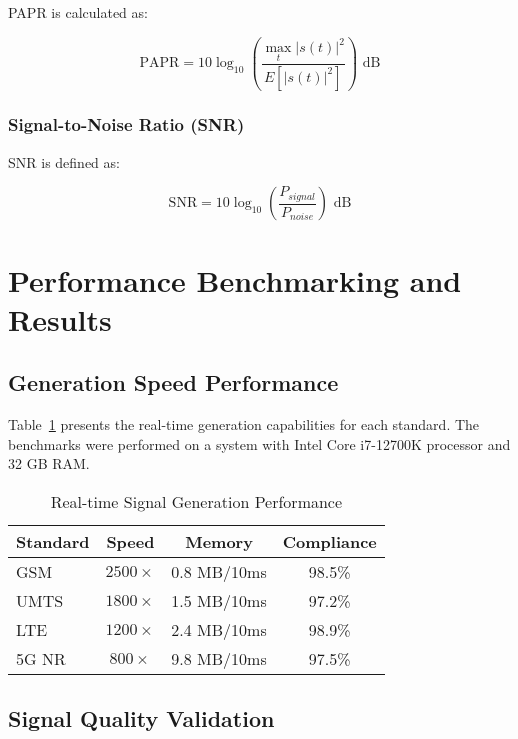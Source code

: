 \documentclass[conference]{IEEEtran}
\begin{document}
PAPR is calculated as:

\begin{equation}
\text{PAPR} = 10\log_{10}\left(\frac{\max_{t}|s(t)|^2}{E[|s(t)|^2]}\right) \text{ dB}
\label{eq:papr}
\end{equation}

\subsubsection{Signal-to-Noise Ratio (SNR)}

SNR is defined as:

\begin{equation}
\text{SNR} = 10\log_{10}\left(\frac{P_{signal}}{P_{noise}}\right) \text{ dB}
\label{eq:snr}
\end{equation}

\section{Performance Benchmarking and Results}
\label{sec:benchmarking}

\subsection{Generation Speed Performance}

Table~\ref{tab:performance} presents the real-time generation capabilities for each standard. The benchmarks were performed on a system with Intel Core i7-12700K processor and 32 GB RAM.

\begin{table}[!t]
\renewcommand{\arraystretch}{1.3}
\caption{Real-time Signal Generation Performance}
\label{tab:performance}
\centering
\begin{tabular}{lccc}
\toprule
\textbf{Standard} & \textbf{Speed} & \textbf{Memory} & \textbf{Compliance} \\
\midrule
GSM & $2500\times$ & 0.8 MB/10ms & 98.5\% \\
UMTS & $1800\times$ & 1.5 MB/10ms & 97.2\% \\
LTE & $1200\times$ & 2.4 MB/10ms & 98.9\% \\
5G NR & $800\times$ & 9.8 MB/10ms & 97.5\% \\
\bottomrule
\end{tabular}
\end{table}

\subsection{Signal Quality Validation}
\end{document}
